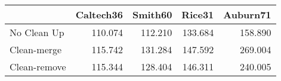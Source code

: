 \begin{tabular}{lrrrr}
\toprule
{} & Caltech36 & Smith60 &  Rice31 & Auburn71 \\
\midrule
No Clean Up  &   110.074 & 112.210 & 133.684 &  158.890 \\
Clean-merge  &   115.742 & 131.284 & 147.592 &  269.004 \\
Clean-remove &   115.344 & 128.404 & 146.311 &  240.005 \\
\bottomrule
\end{tabular}
